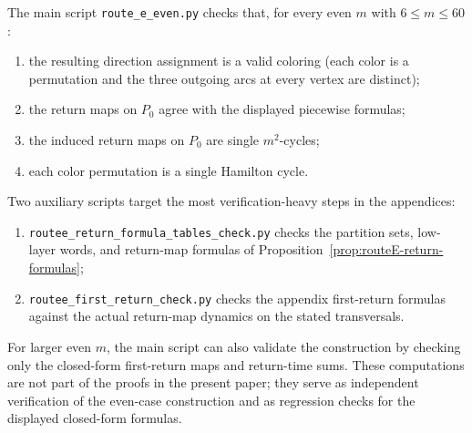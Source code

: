\documentclass[11pt]{article}
\begin{document}
The main script \texttt{route\_e\_even.py} checks that, for every even $m$ with $6\le m\le 60$:
\begin{enumerate}[leftmargin=2.2em]
\item the resulting direction assignment is a valid coloring (each color is a permutation and the three outgoing arcs at every vertex are distinct);
\item the return maps on $P_0$ agree with the displayed piecewise formulas;
\item the induced return maps on $P_0$ are single $m^2$-cycles;
\item each color permutation is a single Hamilton cycle.
\end{enumerate}
Two auxiliary scripts target the most verification-heavy steps in the appendices:
\begin{enumerate}[leftmargin=2.2em,label=(\alph*)]
\item \texttt{routee\_return\_formula\_tables\_check.py} checks the partition sets, low-layer words, and return-map formulas of Proposition~\ref{prop:routeE-return-formulas};
\item \texttt{routee\_first\_return\_check.py} checks the appendix first-return formulas against the actual return-map dynamics on the stated transversals.
\end{enumerate}
For larger even $m$, the main script can also validate the construction by checking only the closed-form first-return maps and return-time sums.
These computations are not part of the proofs in the present paper; they serve as independent verification of the even-case construction and as regression checks for the displayed closed-form formulas.
\end{document}
